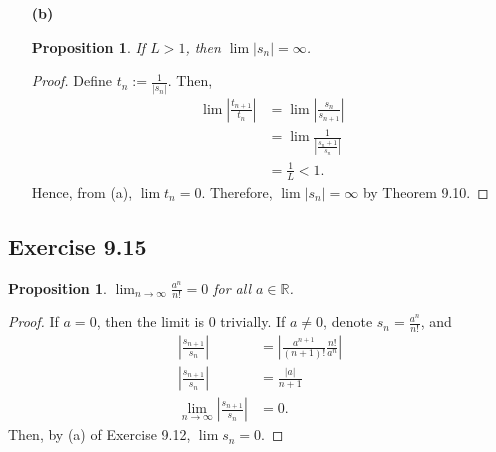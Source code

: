 \documentclass{article}
\newtheorem{proposition}[thm]{Proposition}
\begin{document}
\begin{enumerate}
    \newpage
    \item[\textbf{(b)}]
    \begin{proposition}
        If $L>1$, then $\lim |s_n|=\infty$.
    \end{proposition}
    \begin{proof}
        Define $t_n:=\frac{1}{|s_n|}$. Then, 
        \begin{align*}
            \lim \left|\frac{t_{n+1}}{t_n}\right| & = \lim \left|\frac{s_n}{s_{n+1}}\right| \\
            & = \lim \frac{1}{\left|\frac{s_n+1}{s_n}\right|} \\
            & = \frac{1}{L} < 1.
        \end{align*}
        Hence, from (a), $\lim t_n=0$. Therefore, $\lim |s_n|=\infty$ by Theorem 9.10.
    \end{proof}
\end{enumerate}

\subsection*{Exercise 9.15}
\begin{proposition}
    $\lim_{n\to\infty}\frac{a^n}{n!}=0$ for all $a\in\mathbb{R}$.
\end{proposition}
\begin{proof}
    If $a=0$, then the limit is 0 trivially. If $a\neq 0$, denote $s_n = \frac{a^n}{n!}$, and 
    \begin{align*}
        \left|\frac{s_{n+1}}{s_n}\right| & = \left|\frac{a^{n+1}}{(n+1)!}\frac{n!}{a^n}\right| \\
        \left|\frac{s_{n+1}}{s_n}\right| & = \frac{|a|}{n+1} \\
        \lim_{n\to\infty}\left|\frac{s_{n+1}}{s_n}\right| & = 0.
    \end{align*}
    Then, by (a) of Exercise 9.12, $\lim s_n=0$.
\end{proof}
\end{document}
